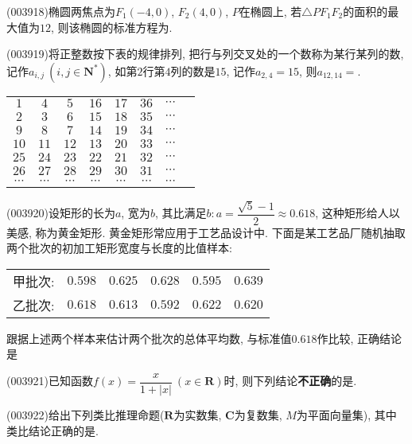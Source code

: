 \item (003918)椭圆两焦点为$F_1(-4,0)$, $F_2(4,0)$, $P$在椭圆上, 若$\triangle PF_1F_2$的面积的最大值为$12$, 则该椭圆的标准方程为.
\item (003919)将正整数按下表的规律排列, 把行与列交叉处的一个数称为某行某列的数, 记作$a_{i,j} \ (i,j\in \mathbf{N}^*)$, 如第$2$行第$4$列的数是$15$, 记作$a_{2,4}=15$, 则$a_{12,14}=$.
\begin{center}
\begin{tabular}{cccccccc}
$1$ & $4$ & $5$ & $16$ & $17$ & $36$ & $\cdots$\\
$2$ & $3$ & $6$ & $15$ & $18$ & $35$ & $\cdots$\\
$9$ & $8$ & $7$ & $14$ & $19$ & $34$ & $\cdots$\\
$10$ & $11$ & $12$ & $13$ & $20$ & $33$ & $\cdots$\\
$25$ & $24$ & $23$ & $22$ & $21$ & $32$ & $\cdots$\\
$26$ & $27$ & $28$ & $29$ & $30$ & $31$ & $\cdots$\\
$\cdots$ & $\cdots$ & $\cdots$ & $\cdots$ & $\cdots$ & $\cdots$ & $\cdots$
\end{tabular}
\end{center}
\item (003920)设矩形的长为$a$, 宽为$b$, 其比满足$b:a=\dfrac{\sqrt{5}-1}{2}\approx 0.618$, 这种矩形给人以美感, 称为黄金矩形. 黄金矩形常应用于工艺品设计中. 下面是某工艺品厂随机抽取两个批次的初加工矩形宽度与长度的比值样本:
\begin{center}
\begin{tabular}{cccccc}
甲批次: & $0.598$ & $0.625$ & $0.628$ & $0.595$ & $0.639$\\
乙批次: & $0.618$ & $0.613$ & $0.592$ & $0.622$ & $0.620$
\end{tabular}
\end{center}
跟据上述两个样本来估计两个批次的总体平均数, 与标准值$0.618$作比较, 正确结论是
\item (003921)已知函数$f(x)=\dfrac{x}{1+|x|} \ (x\in \mathbf{R})$时, 则下列结论{\bf 不正确}的是.
\item (003922)给出下列类比推理命题($\mathbf{R}$为实数集, $\mathbf{C}$为复数集, $M$为平面向量集), 其中类比结论正确的是.
